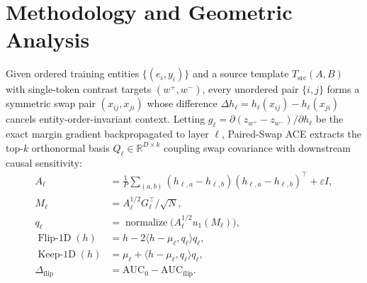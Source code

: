 \documentclass[10pt]{article}
\begin{document}
\section{Methodology and Geometric Analysis}
Given ordered training entities $\{(e_i, y_i)\}$ and a source template $T_{\mathrm{src}}(A,B)$ with single-token contrast targets $(w^+, w^-)$, every unordered pair $\{i,j\}$ forms a symmetric swap pair $(x_{ij}, x_{ji})$ whose difference $\Delta h_\ell = h_\ell(x_{ij}) - h_\ell(x_{ji})$ cancels entity-order-invariant context. Letting $g_\ell = \partial(z_{w^+} - z_{w^-})/\partial h_\ell$ be the exact margin gradient backpropagated to layer $\ell$, Paired-Swap ACE extracts the top-$k$ orthonormal basis $Q_\ell \in \mathbb{R}^{D\times k}$ coupling swap covariance with downstream causal sensitivity:
\begin{align}
  A_\ell &= \tfrac{1}{P}\sum_{(a,b)} (h_{\ell,a} - h_{\ell,b})(h_{\ell,a} - h_{\ell,b})^\top + \varepsilon I, \nonumber \\
  M_\ell &= A_\ell^{1/2} G_\ell^\top / \sqrt{N}, \nonumber \\
  q_\ell &= \operatorname{normalize}\!\big(A_\ell^{1/2} u_1(M_\ell)\big), \label{eq:ace_cov} \\
  \operatorname{Flip\text{-}1D}(h) &= h - 2\langle h - \mu_\ell, q_\ell\rangle q_\ell, \label{eq:ace_flip} \\
  \operatorname{Keep\text{-}1D}(h) &= \mu_\ell + \langle h - \mu_\ell, q_\ell\rangle q_\ell, \nonumber \\
  \Delta_{\mathrm{flip}} &= \mathrm{AUC}_0 - \mathrm{AUC}_{\mathrm{flip}}. \label{eq:ace_keep}
\end{align}
\end{document}
